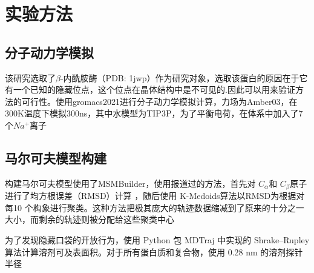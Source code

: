 \documentclass[a4paper]{article}
\begin{document}
\begin{CJK}{UTF8}{gbsn}
	\subsection{}


\section{实验方法}
	\subsection{分子动力学模拟}

该研究选取了$\beta$-内酰胺酶（PDB: 1jwp）作为研究对象，选取该蛋白的原因在于它有一个已知的隐藏位点，这个位点在晶体结构中是不可见的.因此可以用来验证方法的可行性。使用gromacs2021进行分子动力学模拟计算，力场为Amber03，在300K温度下模拟300ns，其中水模型为TIP3P，为了平衡电荷，在体系中加入了7个$Na^{+}$离子

	\subsection{马尔可夫模型构建}
构建马尔可夫模型使用了MSMBuilder，使用报道过的方法，首先对 $C_{\alpha} $和 $C_{\beta}$原子进行了均方根误差（RMSD）计算 ，随后使用 K-Medoids算法以RMSD为根据对每10 个构象进行聚类。这种方法把极其庞大的轨迹数据缩减到了原来的十分之一大小，而剩余的轨迹则被分配给这些聚类中心


为了发现隐藏口袋的开放行为，使用 Python 包 MDTraj 中实现的 Shrake–Rupley 算法计算溶剂可及表面积。对于所有蛋白质和复合物，使用 0.28 nm 的溶剂探针半径


\end{CJK}
\end{document}

